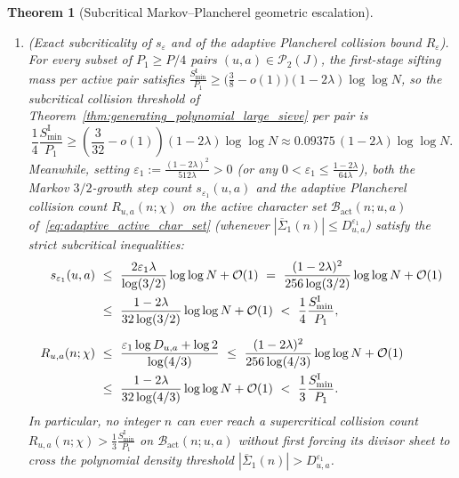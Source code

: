 \documentclass[11pt, a4paper]{article}
\theoremstyle{plain}
\newtheorem{theorem}{Theorem}[section]
\theoremstyle{definition}
\begin{document}
\begin{theorem}[Subcritical Markov--Plancherel geometric escalation]
\begin{enumerate}[label=(\alph*)]
    \item \emph{(Exact subcriticality of $s_\varepsilon$ and of the adaptive Plancherel collision bound $R_\varepsilon$).} 
    For every subset of $P_1\ge P/4$ pairs $(u,a)\in\mathcal{P}_2(J)$, the first-stage sifting mass per active pair satisfies $\frac{S_{\min}^{\mathrm{I}}}{P_1}\ge\big(\frac38-o(1)\big)(1-2\lambda)\log\log N$, so the subcritical collision threshold of Theorem~\ref{thm:generating_polynomial_large_sieve} per pair is 
    \[
    \frac14\frac{S_{\min}^{\mathrm{I}}}{P_1}\ge\left(\frac{3}{32}-o(1)\right)(1-2\lambda)\log\log N\approx 0.09375\,(1-2\lambda)\log\log N.
    \]
    Meanwhile, setting $\varepsilon_1:=\frac{(1-2\lambda)^{2}}{512\lambda}>0$ (or any $0<\varepsilon_1\le\frac{1-2\lambda}{64\lambda}$), both the Markov $3/2$-growth step count $s_{\varepsilon_1}(u,a)$ and the adaptive Plancherel collision count $R_{u,a}(n;\chi)$ on the active character set $\mathcal{B}_{\mathrm{act}}(n;u,a)$ of~\eqref{eq:adaptive_active_char_set} (whenever $|\overline{\Sigma}_1(n)|\le D_{u,a}^{\varepsilon_1}$) satisfy the strict subcritical inequalities:
    \begin{align}
    s_{\varepsilon_1}(u,a)\ &\le\ \frac{2\varepsilon_1\lambda}{\log(3/2)}\log\log N+\mathcal{O}(1)\ =\ \frac{(1-2\lambda)^{2}}{256\log(3/2)}\log\log N+\mathcal{O}(1)\notag\\
    &\le\ \frac{1-2\lambda}{32\log(3/2)}\log\log N+\mathcal{O}(1)\ <\ \frac14\frac{S_{\min}^{\mathrm{I}}}{P_1},\label{eq:s_eps_strictly_subcritical}\\[6pt]
    R_{u,a}(n;\chi)\ &\le\ \frac{\varepsilon_1\log D_{u,a}+\log 2}{\log(4/3)}\ \le\ \frac{(1-2\lambda)^{2}}{256\log(4/3)}\log\log N+\mathcal{O}(1)\notag\\
    &\le\ \frac{1-2\lambda}{32\log(4/3)}\log\log N+\mathcal{O}(1)\ <\ \frac13\frac{S_{\min}^{\mathrm{I}}}{P_1}.\label{eq:R_eps_strictly_subcritical}
    \end{align}
    In particular, no integer $n$ can ever reach a supercritical collision count $R_{u,a}(n;\chi)>\frac13\frac{S_{\min}^{\mathrm{I}}}{P_1}$ on $\mathcal{B}_{\mathrm{act}}(n;u,a)$ without \emph{first} forcing its divisor sheet to cross the polynomial density threshold $|\overline{\Sigma}_1(n)|>D_{u,a}^{\varepsilon_1}$.
    

\end{enumerate}
\end{theorem}
\end{document}

